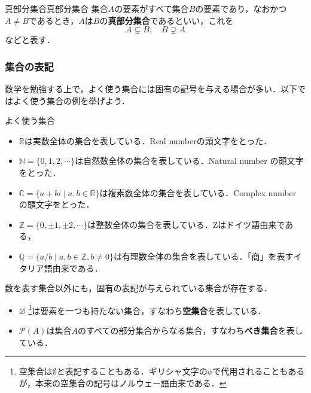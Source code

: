 \documentclass[a4paper,11pt]{ltjsarticle}
\renewcommand{\emph}[1]{\textbf{#1}}
\begin{document}
        \begin{definition}{真部分集合}{真部分集合}
          集合$A$の要素がすべて集合$B$の要素であり，なおかつ$A \ne B$であるとき，$A$は$B$の\emph{真部分集合}であるといい，これを
          \[
          A \subsetneq B,\quad B \supsetneq A
          \]
          などと表す．
        \end{definition}
      
        \subsubsection{集合の表記}
        
        数学を勉強する上で，よく使う集合には固有の記号を与える場合が多い．以下ではよく使う集合の例を挙げよう．
      
        \begin{shadebox}
          よく使う集合
            \begin{itemize}
            \item $\mathbb{R}$は実数全体の集合を表している．Real numberの頭文字をとった．
            \item $\mathbb{N}=\{0,1,2,\cdots \}$は自然数全体の集合を表している．Natural number の頭文字をとった．
            \item $\mathbb{C}=\{ a+bi \mid a,b \in \mathbb{R}\}$は複素数全体の集合を表している．Complex number の頭文字をとった．
            \item $\mathbb{Z}=\{0, \pm 1 , \pm 2 , \cdots\}$は整数全体の集合を表している．Zはドイツ語由来である，
            \item $\mathbb{Q}=\{ a/b \mid   a,b \in \mathbb{Z},b \ne 0 \}$は有理数全体の集合を表している．「商」を表すイタリア語由来である．
            \end{itemize}
        \end{shadebox}
      
      
      \begin{shadebox}
        数を表す集合以外にも，固有の表記が与えられている集合が存在する．
        \begin{itemize}
        \item $\varnothing$ \footnote{空集合は$\emptyset$と表記することもある．ギリシャ文字の$\phi$で代用されることもあるが，本来の空集合の記号はノルウェー語由来である．}は要素を一つも持たない集合，すなわち\emph{空集合}を表している．
        \item $\mathcal{P}(A)$は集合$A$のすべての部分集合からなる集合，すなわち\emph{べき集合}を表している．
       \end{itemize}
      \end{shadebox}
      
\end{document}
